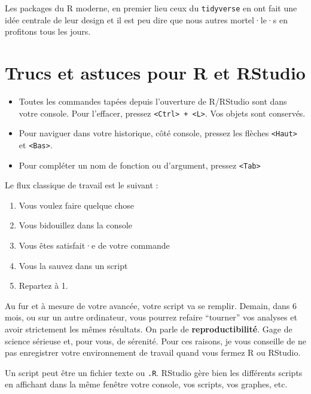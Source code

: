 \documentclass[
  letterpaper,
  DIV=11,
  numbers=noendperiod]{scrreprt}
\providecommand{\tightlist}{%
  \setlength{\itemsep}{0pt}\setlength{\parskip}{0pt}}\usepackage{longtable,booktabs,array}
\begin{document}
Les packages du R moderne, en premier lieu ceux du \texttt{tidyverse} en
ont fait une idée centrale de leur design et il est peu dire que nous
autres mortel·le·s en profitons tous les jours.

\hypertarget{trucs-et-astuces-pour-r-et-rstudio}{%
\section{Trucs et astuces pour R et
RStudio}\label{trucs-et-astuces-pour-r-et-rstudio}}

\begin{itemize}
\tightlist
\item
  Toutes les commandes tapées depuis l'ouverture de R/RStudio sont dans
  votre console. Pour l'effacer, pressez
  \texttt{\textless{}Ctrl\textgreater{}\ +\ \textless{}L\textgreater{}}.
  Vos objets sont conservés.
\item
  Pour naviguer dans votre historique, côté console, pressez les flèches
  \texttt{\textless{}Haut\textgreater{}} et
  \texttt{\textless{}Bas\textgreater{}}.
\item
  Pour compléter un nom de fonction ou d'argument, pressez
  \texttt{\textless{}Tab\textgreater{}}
\end{itemize}

Le flux classique de travail est le suivant :

\begin{enumerate}
\def\labelenumi{\arabic{enumi}.}
\tightlist
\item
  Vous voulez faire quelque chose
\item
  Vous bidouillez dans la console
\item
  Vous êtes satisfait·e de votre commande
\item
  Vous la sauvez dans un script
\item
  Repartez à 1.
\end{enumerate}

Au fur et à mesure de votre avancée, votre script va se remplir. Demain,
dans 6 mois, ou sur un autre ordinateur, vous pourrez refaire
``tourner'' vos analyses et avoir strictement les mêmes résultats. On
parle de \textbf{reproductibilité}. Gage de science sérieuse et, pour
vous, de sérenité. Pour ces raisons, je vous conseille de ne pas
enregistrer votre environnement de travail quand vous fermez R ou
RStudio.

Un script peut être un fichier texte ou \texttt{.R}. RStudio gère bien
les différents scripts en affichant dans la même fenêtre votre console,
vos scripts, vos graphes, etc.
\end{document}
